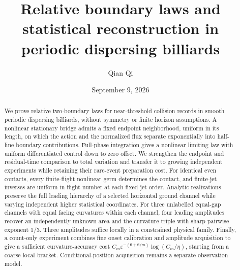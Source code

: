 
\title[Relative boundary laws and statistical reconstruction]{Relative boundary laws and statistical reconstruction
in periodic dispersing billiards}
\author{Qian Qi}
\date{September 9, 2026}

\begin{abstract}
We prove relative two-boundary laws for near-threshold collision records
in smooth periodic dispersing billiards, without symmetry or finite
horizon assumptions. A nonlinear stationary bridge admits a fixed
endpoint neighborhood, uniform in its length, on which the action and
the normalized flux separate exponentially into half-line boundary
contributions. Full-phase integration gives a nonlinear limiting law
with uniform differentiated control down to zero offset. We strengthen
the endpoint and residual-time comparison to total variation and transfer
it to growing independent experiments while retaining their rare-event
preparation cost. For identical even contacts, every finite-flight
nonlinear germ determines the contact, and finite-jet inverses are
uniform in flight number at each fixed jet order. Analytic realizations
preserve the full leading hierarchy of a selected horizontal ground
channel while varying independent higher statistical coordinates. For
three unlabelled equal-gap channels with equal facing curvatures within
each channel, four leading amplitudes recover an independently unknown
area and the curvature triple with sharp pairwise exponent $1/3$.
Three amplitudes suffice locally in a constrained physical family.
Finally, a count-only experiment combines fine onset calibration and
amplitude acquisition to give a sufficient curvature-accuracy cost
$C_m\varepsilon^{-(6+6/m)}\log(C_m/\eta)$, starting from a coarse local
bracket. Conditional-position acquisition remains a separate observation
model.
\end{abstract}
\maketitle



















\appendix









